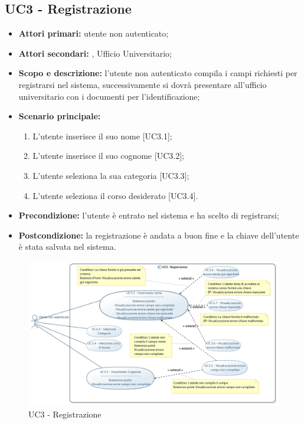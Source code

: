\documentclass[AnalisiDeiRequisiti.tex]{subfiles}
\begin{document}
\subsection{UC3 - Registrazione}
\begin{itemize}
	\item \textbf{Attori primari:} utente non autenticato;
	\item \textbf{Attori secondari:} , Ufficio Universitario;
	\item \textbf{Scopo e descrizione:} l'utente non autenticato compila i campi richiesti per registrarsi nel sistema, successivamente si dovrà presentare all'ufficio universitario con i documenti per l'identificazione;
	\item \textbf{Scenario principale:}
	\begin{enumerate}
		\item L'utente inserisce il suo nome [UC3.1];
		\item L'utente inserisce il suo cognome [UC3.2];
		\item L'utente seleziona la sua categoria [UC3.3];
		\item L'utente seleziona il corso desiderato [UC3.4].
	\end{enumerate}
	\item \textbf{Precondizione:} l'utente è entrato nel sistema e ha scelto di registrarsi;
	\item \textbf{Postcondizione:} la registrazione è andata a buon fine e la chiave dell'utente è stata salvata nel sistema.
\end{itemize}

\begin{figure}[H]
	\centering
	\includegraphics[width=1.0\linewidth]{UC3.jpg}
	\caption{UC3 - Registrazione}
	\label{fig:UC3 - Registrazione}
\end{figure}
\end{document}
